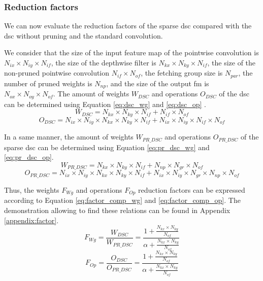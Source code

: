 \subsubsection{Reduction factors}
%
We can now evaluate the reduction factors of the sparse \acrshort{dsc} compared with the \acrshort{dsc} without pruning and the standard convolution.

We consider that the size of the input feature map of the pointwise convolution is $N_{ix}  \times N_{iy} \times N_{if}$, the size of the depthwise filter is $N_{kx} \times N_{ky} \times N_{if}$, the size of the non-pruned pointwise convolution $N_{if} \times N_{of}$, the fetching group size is $N_{par}$, the number of pruned weights is $N_{np}$, and the size of the output \acrshort{fm} is $N_{ox}  \times N_{oy} \times N_{of}$. The amount of weights $W_{DSC}$ and operations $O_{DSC}$ of the \acrshort{dsc} can be determined using Equation \eqref{eq:dsc_wg} and \eqref{eq:dsc_op} \cite{bai_cnn_2018, liu_fpga-based_2019}.
%
\begin{equation}
    W_{DSC} = N_{kx} \times N_{ky} \times N_{if} + N_{if} \times N_{of}
    \label{eq:dsc_wg}
\end{equation}
%
\begin{equation}
    O_{DSC} = N_{ix} \times N_{iy} \times N_{kx} \times N_{ky} \times N_{if} + N_{ix} \times N_{iy} \times N_{if} \times N_{of}
    \label{eq:dsc_op}
\end{equation}

In a same manner, the amount of weights $W_{PR\_DSC}$ and operations $O_{PR\_DSC}$ of the sparse \acrshort{dsc} can be determined using Equation \eqref{eq:pr_dsc_wg} and \eqref{eq:pr_dsc_op}.
%
\begin{equation}
    W_{PR\_DSC} = N_{kx} \times N_{ky} \times N_{if} + N_{np} \times N_{gr} \times N_{of}
    \label{eq:pr_dsc_wg}
\end{equation}
%
\begin{equation}
    O_{PR\_DSC} = N_{ix} \times N_{iy} \times N_{kx} \times N_{ky} \times N_{if} + N_{ix} \times N_{iy} \times N_{gr} \times N_{np} \times N_{of}
    \label{eq:pr_dsc_op}
\end{equation}

Thus, the weights $F_{Wg}$ and operations $F_{Op}$ reduction factors can be expressed according to Equation \eqref{eq:factor_comp_wg} and \eqref{eq:factor_comp_op}. The demonstration allowing to find these relations can be found in Appendix \ref{appendix:factor}.
%
\begin{equation}
    F_{Wg} = \frac{W_{DSC}}{W_{PR\_DSC}} = \frac{1 + \frac{N_{kx} \times N_{ky}} {N_{of}}} {\alpha + \frac{N_{kx} \times N_{ky}} {N_{of}}}
    \label{eq:factor_comp_wg}
\end{equation}
\begin{equation}
    F_{Op} = \frac{O_{DSC}}{O_{PR\_DSC}} = \frac{1 + \frac{N_{kx} \times N_{ky}} {N_{of}}} {\alpha + \frac{N_{kx} \times N_{ky}} {N_{of}}}
    \label{eq:factor_comp_op}
\end{equation}


